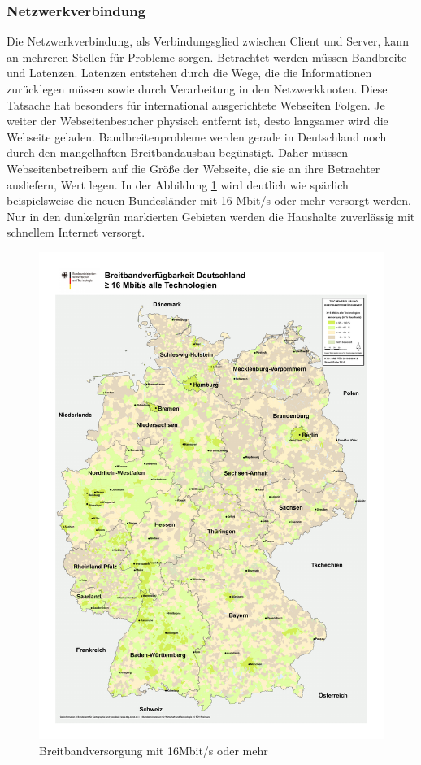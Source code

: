 \subsubsection{Netzwerkverbindung}
Die Netzwerkverbindung, als Verbindungsglied zwischen Client und Server, kann an mehreren Stellen f\"ur Probleme sorgen. Betrachtet werden m\"ussen Bandbreite und Latenzen. Latenzen entstehen durch die Wege, die die Informationen zur\"ucklegen m\"ussen sowie durch Verarbeitung in den Netzwerkknoten. Diese Tatsache hat besonders f\"ur international ausgerichtete Webseiten Folgen. Je weiter der Webseitenbesucher physisch entfernt ist, desto langsamer wird die Webseite geladen. Bandbreitenprobleme werden gerade in Deutschland noch durch den mangelhaften Breitbandausbau beg\"unstigt. Daher m\"ussen Webseitenbetreibern auf die Größe der Webseite, die sie an ihre Betrachter ausliefern, Wert legen. In der Abbildung \ref{fig:breitband} wird deutlich wie sp\"arlich beispielsweise die neuen Bundesl\"ander mit 16 Mbit/s oder mehr versorgt werden.\citep{BMWi2011} Nur in den dunkelgrün markierten Gebieten werden die Haushalte zuverlässig mit schnellem Internet versorgt.
\begin{figure}[!ht]
  \centering
  \includegraphics[scale=0.5]{material/breitband201116mbit.pdf}
  \caption{Breitbandversorgung mit 16Mbit/s oder mehr}
  \label{fig:breitband}
\end{figure}
